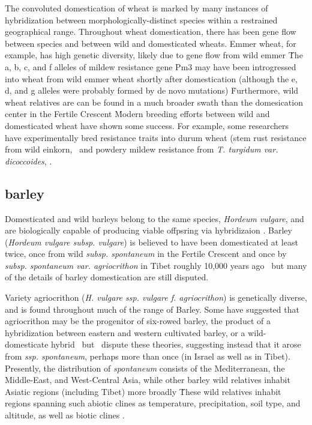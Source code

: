 \documentclass[11pt]{article}
\begin{document}
The convoluted domestication of wheat is marked by many instances of hybridization between morphologically-distinct species within a restrained geographical range.
Throughout wheat domestication, there has been gene flow between species and between wild and domesticated wheats.
Emmer wheat, for example, has high genetic diversity, likely due to gene flow from wild emmer \cite{luo2007structure, dvorak2006molecular}\.
The a, b, c, and f alleles of mildew resistance gene Pm3 may have been introgressed into wheat from wild emmer wheat shortly after domestication (although the e, d, and g alleles were probably formed by de novo mutations) \cite{TPJ:TPJ2772}\.
Furthermore, wild wheat relatives are can be found in a much broader swath than the domesication center in the Fertile Crescent \cite{CWR}\.
Modern breeding efforts between wild and domesticated wheat have shown some success.
For example, some researchers have experimentally bred resistance traits into durum wheat (stem rust resistance from wild einkorn, \cite{gerechter1971transfer}\, and powdery mildew resistance from \emph{T. turgidum var. dicoccoides}, \cite{blanco2008molecular}.














\subsection*{barley}

Domesticated and wild barleys belong to the same species, \emph{Hordeum vulgare}, and are biologically capable of producing viable offpsring via hybridizaion \cite{von1995ecographical}.
Barley (\emph{Hordeum vulgare subsp. vulgare}) is believed to have been domesticated at least twice, once from wild \emph{subsp. spontaneum} in the Fertile Crescent and once by \emph{subsp. spontaneum var. agriocrithon} in Tibet roughly 10,000 years ago \cite{takahashi1955origin, badr2000origin, oka2012origin, azhaguvel2007phylogenetic, haberer2015barley}\, but many of the details of barley domestication are still disputed.

Variety agriocrithon (\emph{H. vulgare ssp. vulgare f. agriocrithon}) is genetically diverse, and is found throughout much of the range of Barley.
Some have suggested that agriocrithon may be the progenitor of six-rowed barley, the product of a hybridization between eastern and western cultivated barley, or a wild-domesticate hybrid \cite{staudt1961origin, zohary1959hordeum, murphy1982origin}\, but \cite{azhaguvel2007phylogenetic}\ dispute these theories, suggesting instead that it arose from \emph{ssp. spontaneum}, perhaps more than once (in Israel as well as in Tibet).
Presently, the distribution of \emph{spontaneum} consists of the Mediterranean, the Middle-East, and West-Central Asia, while other barley wild relatives inhabit Asiatic regions (including Tibet) more broadly \cite{nevo2010drought, harlan1995living, CWR}\.
These wild relatives inhabit regions spanning such abiotic clines as temperature, precipitation, soil type, and altitude, as well as biotic clines \cite{nevo2010drought}.
\end{document}
